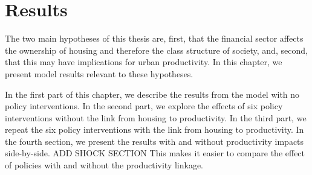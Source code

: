 \chapter{Results} \label{chapter-results}

The two main hypotheses of this thesis are, first, that the financial sector affects the ownership of housing and therefore the class structure of society, and, second, that this may have implications for urban productivity.  In this chapter, we present model results relevant to these hypotheses.

In the first part of this chapter, we describe the results from the model with no policy interventions. In the second part, we explore the effects of six policy interventions without the link from housing to productivity. In the third part, we repeat the six policy interventions with the link from housing to productivity.  %
In the fourth section, we present the results with and without productivity impacts side-by-side. {\color{red} ADD SHOCK SECTION} This makes it easier to compare the effect of policies with and without the productivity linkage. 


